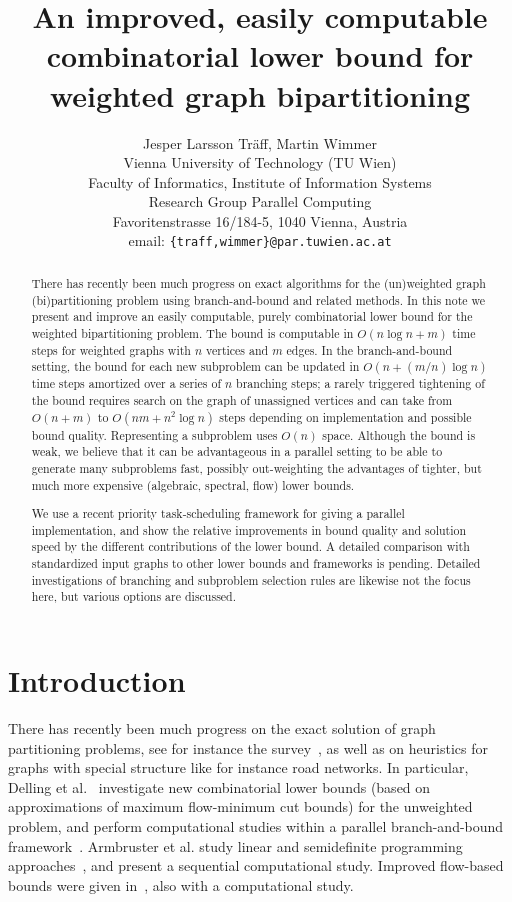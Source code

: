 \documentclass[a4paper,11pt]{article}
\title{An improved, easily computable combinatorial lower bound
  for weighted graph bipartitioning}
\author{Jesper Larsson Tr\"aff, Martin Wimmer\\
Vienna University of Technology (TU Wien)\\
Faculty of Informatics, Institute of Information Systems\\ 
Research Group Parallel Computing\\
Favoritenstrasse 16/184-5, 1040 Vienna, Austria\\
email: \texttt{\{traff,wimmer\}@par.tuwien.ac.at}
}
\begin{document}
\maketitle

\begin{abstract}
There has recently been much progress on exact algorithms for the
(un)weighted graph (bi)partitioning problem using branch-and-bound and
related methods.  In this note we present and improve an easily
computable, purely combinatorial lower bound for the weighted
bipartitioning problem. The bound is computable in $O(n\log n+m)$ time
steps for weighted graphs with $n$ vertices and $m$ edges. In the
branch-and-bound setting, the bound for each new subproblem can be
updated in $O(n+(m/n)\log n)$ time steps amortized over a series of $n$
branching steps; a rarely triggered tightening of the bound requires
search on the graph of unassigned vertices and can take from $O(n+m)$
to $O(nm+n^2\log n)$ steps depending on implementation and possible
bound quality. Representing a subproblem uses $O(n)$ space. Although
the bound is weak, we believe that it can be advantageous in a
parallel setting to be able to generate many subproblems fast,
possibly out-weighting the advantages of tighter, but much more
expensive (algebraic, spectral, flow) lower bounds.

We use a recent priority task-scheduling framework for giving a
parallel implementation, and show the relative improvements in bound
quality and solution speed by the different contributions of the lower
bound. A detailed comparison with standardized input graphs to other
lower bounds and frameworks is pending. Detailed investigations of
branching and subproblem selection rules are likewise not the focus
here, but various options are discussed.
\end{abstract}

\section{Introduction}

There has recently been much progress on the exact solution of graph
partitioning problems, see for instance the
survey~\cite{MeyerhenkeSanders13}, as well as on heuristics for graphs
with special structure like for instance road networks.  In
particular, Delling et
al.~\cite{DellingGoldbergRazenshteynWerneck11,DellingGoldbergRazenshteynWerneck12,DellingWerneck12}
investigate new combinatorial lower bounds (based on approximations of
maximum flow-minimum cut bounds) for the unweighted problem, and
perform computational studies within a parallel branch-and-bound
framework~\cite{BudiuDellingWerneck11}. Armbruster et al. study linear
and semidefinite programming
approaches~\cite{ArmbrusterFugenschuhHelmbergMartin12}, and present a
sequential computational study. Improved flow-based bounds were given
in~\cite{Sensen01}, also with a computational study.
\end{document}
